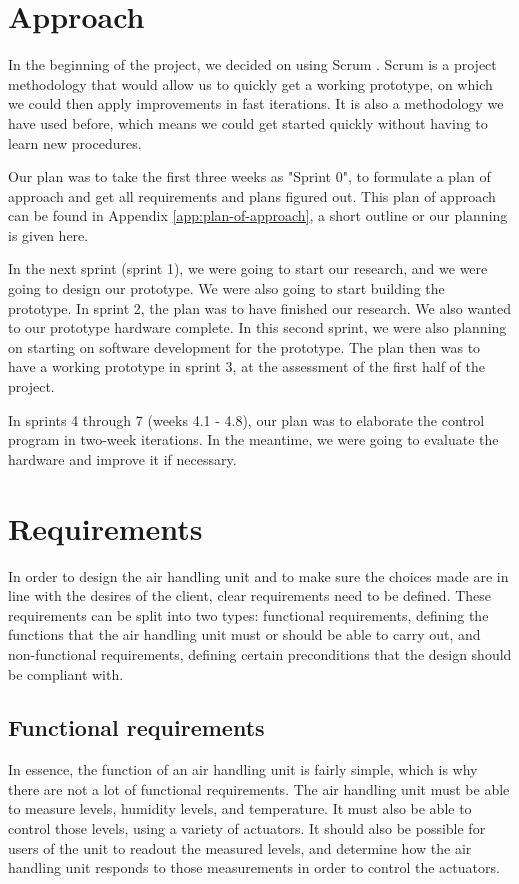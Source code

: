 \documentclass[a4paper,oneside]{book}
\begin{document}
\setcounter{tocdepth}{1}
\tableofcontents
\mainmatter
\chapter{Approach}
In the beginning of the project, we decided on using Scrum \cite{scrum}. Scrum
is a project methodology that would allow us to quickly get a working
prototype, on which we could then apply improvements in fast iterations. It is
also a methodology we have used before, which means we could get started
quickly without having to learn new procedures.

Our plan was to take the first three weeks as "Sprint 0", to formulate a plan
of approach and get all requirements and plans figured out. This plan of
approach can be found in Appendix \ref{app:plan-of-approach}, a short outline
or our planning is given here.

In the next sprint (sprint 1), we were going to start our research, and we were
going to design our prototype. We were also going to start building the
prototype. In sprint 2, the plan was to have finished our research. We also
wanted to our prototype hardware complete. In this second sprint, we were also
planning on starting on software development for the prototype. The plan then
was to have a working prototype in sprint 3, at the assessment of the first
half of the project.

In sprints 4 through 7 (weeks 4.1 - 4.8), our plan was to elaborate the control
program in two-week iterations. In the meantime, we were going to evaluate the
hardware and improve it if necessary.


\chapter{Requirements}
\label{ch:requirements}
In order to design the air handling unit and to make sure the choices made are
in line with the desires of the client, clear requirements need to be defined.
These requirements can be split into two types: functional requirements,
defining the functions that the air handling unit must or should be able to
carry out, and non-functional requirements, defining certain preconditions that
the design should be compliant with.

\section{Functional requirements}
In essence, the function of an air handling unit is fairly simple, which is why
there are not a lot of functional requirements. The air handling unit must be
able to measure  levels, humidity levels, and temperature. It must also
be able to control those levels, using a variety of actuators. It should also
be possible for users of the unit to readout the measured levels, and determine
how the air handling unit responds to those measurements in order to control
the actuators.
\end{document}
